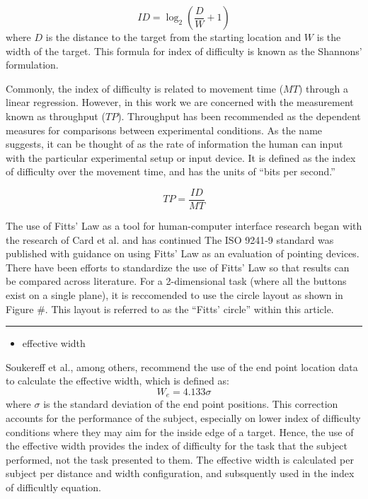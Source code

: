 \begin{equation}
    {ID}=\log_2\left(\frac{D}{W}+1\right)
    \label{index_of_difficulty}
\end{equation}
where $D$ is the distance to the target from the starting location and $W$ is the width of the target.
This formula for index of difficulty is known as the Shannons' formulation.

Commonly, the index of difficulty is related to movement time (${MT}$) through a linear regression.
However, in this work we are concerned with the measurement known as throughput (${TP}$).
Throughput has been recommended as the dependent measures for comparisons between experimental conditions.
As the name suggests, it can be thought of as the rate of information the human can input with the particular experimental setup or input device.
It is defined as the index of difficulty over the movement time, and has the units of ``bits per second.''

\begin{equation}
    {TP}=\frac{ID}{MT}
\end{equation}

The use of Fitts' Law as a tool for human-computer interface research began with the research of Card et al. and has continued
The ISO 9241-9 standard was published with guidance on using Fitts' Law as an evaluation of pointing devices.
There have been efforts to standardize the use of Fitts' Law so that results can be compared across literature.
For a 2-dimensional task (where all the buttons exist on a single plane), it is reccomended to use the circle layout as shown in Figure \#.
This layout is referred to as the ``Fitts' circle'' within this article.

\rule{0.75\textwidth}{1pt}
\begin{itemize}
  \item effective width
\end{itemize}
Soukereff et al., among others, recommend the use of the end point location data to calculate the effective width, which is defined as:
\begin{equation}
    W_e = 4.133\sigma
\end{equation}
where $\sigma$ is the standard deviation of the end point positions.
This correction accounts for the performance of the subject, especially on lower index of difficulty conditions where they may aim for the inside edge of a target.
Hence, the use of the effective width provides the index of difficulty for the task that the subject performed, not the task presented to them.
The effective width is calculated per subject per distance and width configuration, and subsquently used in the index of difficultly equation.

